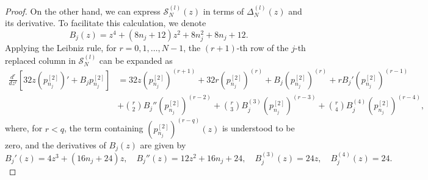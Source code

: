 \documentclass[10pt,a4paper]{amsart}
\begin{document}
\begin{proof}
On the other hand, we can express \(\mathcal S_N^{(l)}(z)\) in terms of \(\Delta_N^{(l)}(z)\) and its derivative. 
To facilitate this calculation, we denote
\begin{equation}
    B_j(z)=z^4+(8n_j+12)z^2+8n_j^2+8n_j+12.
\end{equation}
Applying the Leibniz rule, for  \(r=0,1,\ldots,N-1\), the $(r+1)$-th row of the \(j\)-th replaced column in \(\mathcal S_N^{(l)}\) can be expanded as
\begin{equation}\label{eqn:expantion of the j-th column}
\begin{aligned}
    \frac{d^r}{dz^r}\left[32z\left(p_{n_j}^{[2]}\right)' +B_j p_{n_j}^{[2]} \right] &=
    32z\left(p_{n_j}^{[2]}\right)^{(r+1)} 
    +32r\left(p_{n_j}^{[2]}\right)^{(r)} 
    +B_j \left(p_{n_j}^{[2]}\right)^{(r)} +rB_j' \left(p_{n_j}^{[2]}\right)^{(r-1)} 
     \\
    &+\binom{r}{2}B_j'' \left(p_{n_j}^{[2]}\right)^{(r-2)} 
    +\binom{r}{3}B_j^{(3)} \left(p_{n_j}^{[2]}\right)^{(r-3)} 
    +\binom{r}{4}B_j^{(4)} \left(p_{n_j}^{[2]}\right)^{(r-4)},
\end{aligned}
\end{equation}
where, for \(r<q\), the term containing 
\(\left(p_{n_j}^{[2]}\right)^{(r-q)}(z)\) is understood to be zero, and the derivatives of $B_j(z)$ are given by
\begin{equation}
    B_j'(z)=4z^3+(16n_j+24)z,\quad
    B_j''(z)=12z^2+16n_j+24,\quad
    B_j^{(3)}(z)=24z,\quad B_j^{(4)}(z)=24.
\end{equation}


\end{proof}
\end{document}
